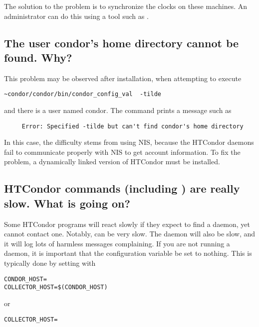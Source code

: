 The solution to the problem is to synchronize the clocks on
these machines.
An administrator can do this using a tool such as .

\subsection*{The user condor's home directory cannot be found.  Why?}

This problem may be observed after installation, when attempting
to execute
\footnotesize
\begin{verbatim}
~condor/condor/bin/condor_config_val  -tilde
\end{verbatim}
\normalsize
and there is a user named condor.
The command prints a message such as
\footnotesize
\begin{verbatim}
     Error: Specified -tilde but can't find condor's home directory
\end{verbatim}
\normalsize

In this case, the difficulty stems from 
using NIS,
because the HTCondor daemons fail to communicate properly with NIS to get
account information.
To fix the problem, a dynamically linked version of HTCondor must
be installed.

\subsection*{HTCondor commands (including ) are really slow. What is going on?}

Some HTCondor programs will react slowly if they expect to find a
 daemon, yet cannot contact one.
Notably,  can be very slow.
The  daemon will also be slow,
and it will log lots of harmless messages complaining.
If you are not running a  daemon,
it is important that the configuration variable
 be set to nothing.
This is typically done by setting  with
\footnotesize
\begin{verbatim}
CONDOR_HOST=
COLLECTOR_HOST=$(CONDOR_HOST)
\end{verbatim}
\normalsize
or
\footnotesize
\begin{verbatim}
COLLECTOR_HOST=
\end{verbatim}
\normalsize

